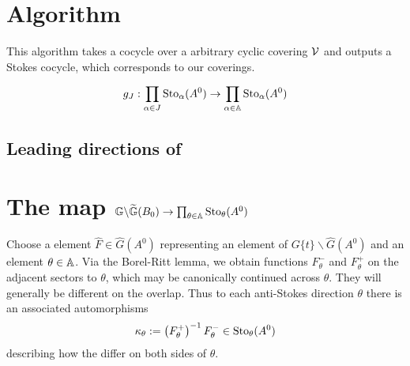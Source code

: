 \section{Algorithm~\cite[II.3.4]{Loday1994}}
This algorithm takes a cocycle over a arbitrary cyclic covering $\mathcal{V}$ and
outputs a Stokes cocycle, which corresponds to our coverings.
\begin{comment}
  \begin{defn}
    \marginnote{\cite[Def.II.1.8]{Loday1994}}
    \rewrite{A cocycle $\dot\phi=(\dot\phi_j)_{j\in J}$ on a cyclic covering
      $\cU=(U_j)_{j\in J}$ is said to be a \emph{Stokes cocycle} when the
      components $\dot\phi_j$, if non trivial, represent Stokes germs
      $\dot\phi_{j,\alpha_j}\in\Sto_{\alpha_j}(A^0$ at anti-Stokes directions
      $\alpha_j$ in a cyclic ascending ordering.}
  \end{defn}
\end{comment}
\[
  g_J:\prod_{\alpha\in J}\operatorname{Sto}_\alpha(A^0)\to\prod_{\alpha\in\mathbb{A}}\operatorname{Sto}_\alpha(A^0)
\]

\subsection{Leading directions of \TODO[\dots]}
\begin{comment}
  See \cite[863ff]{Loday1994}
\end{comment}

\section{The map
  $\mathbb{G}\backslash\widetilde{\mathbb{G}}(B_0)\to\prod_{\theta\in\mathbb{A}}\operatorname{Sto}_\theta(A^0)$}
\begin{comment}
  see \cite[9f]{thboalch}
\end{comment}
Choose a element $\hat F\in\hat G(A^0)$ representing an element of
$G\{t\}\backslash\hat G(A^0)$ and an element $\theta\in\mathbb{A}$.
Via the Borel-Ritt lemma, we obtain functions $F_\theta^-$ and $F_\theta^+$ on
the adjacent sectors to $\theta$, which may be canonically continued across
$\theta$. They will generally be different on the overlap. Thus to each
anti-Stokes direction $\theta$ there is an associated automorphisms
\[
  \kappa_\theta:=\left(F_\theta^+\right)^{-1}F_\theta^-
  \in\operatorname{Sto}_\theta(A^0)
\]
describing how the \TODO{} differ on both sides of $\theta$.

